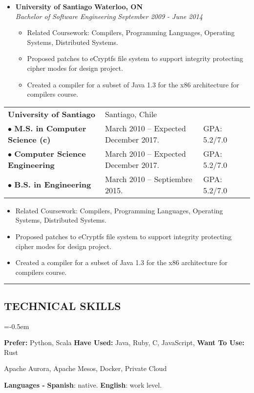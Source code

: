 \documentclass[10pt,letterpaper]{article}
\newcommand{\CPP}
{C\nolinebreak[4]\hspace{-.05em}\raisebox{.22ex}{\footnotesize\bf ++}}
\begin{document}
  \begin{itemize}[leftmargin=*]
    \parskip=-0.5em

    \item[]
    {\textbf{University of Santiago} \hfill
     \textbf{Waterloo, ON}
    }
    \\
    {\emph{Bachelor of Software Engineering} \hfill
      \emph{September 2009 - June 2014}}

    \begin{itemize}[label=\textbullet]
      \item Related Coursework: Compilers, Programming Languages, Operating
        Systems, Distributed Systems.
      \item Proposed patches to eCryptfs file system to support
        integrity protecting cipher modes for design project.
      \item Created a compiler for a subset of Java 1.3 for the
        x86 architecture for compilers course.
    \end{itemize}
  \end{itemize}

\begin{tabular}{lllc}	
	\textbf{University of Santiago}&Santiago, Chile& & \\
	$\bullet$  \textbf{M.S. in Computer Science (c)}& March 2010 – Expected December 2017. & GPA: 5.2/7.0 & \\
	$\bullet$  \textbf{Computer Science Engineering} & March 2010 – Expected December 2017. & GPA: 5.2/7.0 & \\
	$\bullet$  \textbf{B.S. in Engineering} & March 2010 – Septiembre 2015. & GPA: 5.2/7.0  &\\
\end{tabular}

\begin{itemize}[label=\textbullet]
	\item Related Coursework: Compilers, Programming Languages, Operating
	Systems, Distributed Systems.
	\item Proposed patches to eCryptfs file system to support
	integrity protecting cipher modes for design project.
	\item Created a compiler for a subset of Java 1.3 for the
	x86 architecture for compilers course.
\end{itemize}

\hrule
\vspace{-1.0em}

\subsection*{TECHNICAL SKILLS}
\begin{description}[labelindent=\parindent]
  \parskip=-0.5em
  \item[Languages:] \textbf{Prefer:} Python, Scala \textbf{Have Used:} Java, Ruby, \CPP, JavaScript, \textbf{Want To Use:} Rust
  \item[Systems:] Apache Aurora, Apache Mesos, Docker, Private Cloud
\end{description}

\vspace{-1.0em}
\begin{center}
	\textbf{Languages - } \textbf{Spanish}: native. \textbf{English}: work level.
\end{center}
\end{document}
